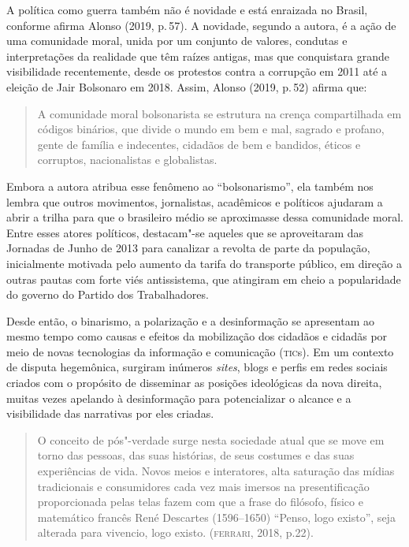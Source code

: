 A política como guerra também não é novidade e está enraizada no Brasil,
conforme afirma Alonso (2019, p.\,57). A novidade, segundo a autora, é a
ação de uma comunidade moral, unida por um conjunto de valores, condutas
e interpretações da realidade que têm raízes antigas, mas que
conquistara grande visibilidade recentemente, desde os protestos contra
a corrupção em 2011 até a eleição de Jair Bolsonaro em 2018. Assim,
Alonso (2019, p.\,52) afirma que:

\begin{quote}
A comunidade moral bolsonarista se estrutura na crença compartilhada em
códigos binários, que divide o mundo em bem e mal, sagrado e profano,
gente de família e indecentes, cidadãos de bem e bandidos, éticos e
corruptos, nacionalistas e globalistas.
\end{quote}

Embora a autora atribua esse fenômeno ao ``bolsonarismo'', ela também
nos lembra que outros movimentos, jornalistas, acadêmicos e políticos
ajudaram a abrir a trilha para que o brasileiro médio se aproximasse
dessa comunidade moral. Entre esses atores políticos, destacam"-se
aqueles que se aproveitaram das Jornadas de Junho de 2013 para canalizar
a revolta de parte da população, inicialmente motivada pelo aumento da
tarifa do transporte público, em direção a outras pautas com forte viés
antissistema, que atingiram em cheio a popularidade do governo do
Partido dos Trabalhadores.

Desde então, o binarismo, a polarização e a desinformação se apresentam
ao mesmo tempo como causas e efeitos da mobilização dos cidadãos e
cidadãs por meio de novas tecnologias da informação e comunicação
(\textsc{tic}s). Em um contexto de disputa hegemônica, surgiram inúmeros
\emph{sites}, blogs e perfis em redes sociais criados com o propósito de
disseminar as posições ideológicas da nova direita, muitas vezes
apelando à desinformação para potencializar o alcance e a visibilidade
das narrativas por eles criadas.

\begin{quote}
O conceito de pós"-verdade surge nesta sociedade atual que se move em
torno das pessoas, das suas histórias, de seus costumes e das suas
experiências de vida. Novos meios e interatores, alta saturação das
mídias tradicionais e consumidores cada vez mais imersos na
presentificação proporcionada pelas telas fazem com que a frase do
filósofo, físico e matemático francês René Descartes (1596--1650)
``Penso, logo existo'', seja alterada para vivencio, logo existo.
(\textsc{ferrari}, 2018, p.22).
\end{quote}

